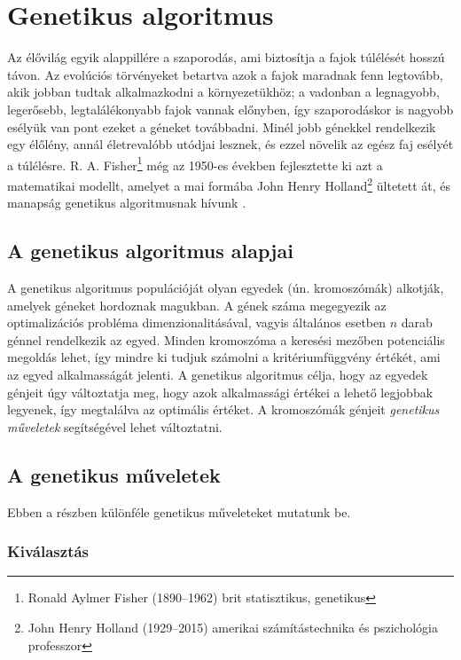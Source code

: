 \chapter{Genetikus algoritmus}

Az élővilág egyik alappillére a szaporodás, ami biztosítja a fajok túlélését hosszú távon. Az evolúciós törvényeket betartva azok a fajok maradnak fenn legtovább, akik jobban tudtak alkalmazkodni a környezetükhöz; a vadonban a legnagyobb, legerősebb, legtalálékonyabb fajok vannak előnyben, így szaporodáskor is nagyobb esélyük van pont ezeket a géneket továbbadni. Minél jobb génekkel rendelkezik egy élőlény, annál életrevalóbb utódjai lesznek, és ezzel növelik az egész faj esélyét a túlélésre. R. A. Fisher\footnote{Ronald Aylmer Fisher (1890--1962) brit statisztikus, genetikus} még az 1950-es években fejlesztette ki azt a matematikai modellt, amelyet a mai formába John Henry Holland\footnote{John Henry Holland (1929--2015) amerikai számítástechnika és pszichológia professzor} ültetett át, és manapság genetikus algoritmusnak  hívunk \parencite{holland2012}.

\section{A genetikus algoritmus alapjai}

A genetikus algoritmus populációját olyan egyedek (ún. kromoszómák) alkotják, amelyek géneket hordoznak magukban. A gének száma megegyezik az optimalizációs probléma dimenzionalitásával, vagyis általános esetben $n$ darab génnel rendelkezik az egyed. Minden kromoszóma a keresési mezőben potenciális megoldás lehet, így mindre ki tudjuk számolni a kritériumfüggvény értékét, ami az egyed alkalmasságát jelenti. A genetikus algoritmus célja, hogy az egyedek génjeit úgy változtatja meg, hogy azok alkalmassági értékei a lehető legjobbak legyenek, így megtalálva az optimális értéket. A kromoszómák génjeit \textit{genetikus műveletek}  segítségével lehet változtatni.

\section{A genetikus műveletek}

Ebben a részben különféle genetikus műveleteket mutatunk be.

\subsection{Kiválasztás}

